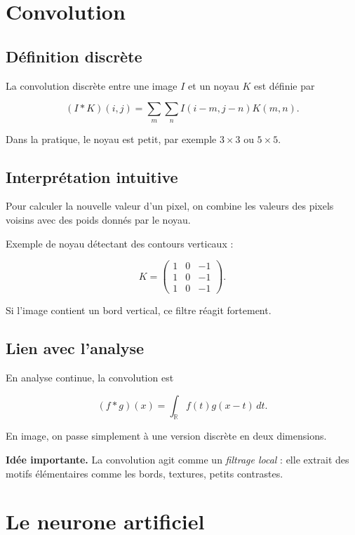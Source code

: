 ﻿\documentclass[11pt,a4paper]{article}
\begin{document}
\section{Convolution}

\subsection{Définition discrète}

La convolution discrète entre une image $I$ et un noyau $K$ est définie par

\[
(I * K)(i,j)=\sum_m \sum_n I(i-m,j-n)K(m,n).
\]

Dans la pratique, le noyau est petit, par exemple $3\times 3$ ou $5\times 5$.

\subsection{Interprétation intuitive}

Pour calculer la nouvelle valeur d’un pixel, on combine les valeurs des pixels voisins avec des poids donnés par le noyau.

Exemple de noyau détectant des contours verticaux :

\[
K=
\begin{pmatrix}
1 & 0 & -1 \\
1 & 0 & -1 \\
1 & 0 & -1
\end{pmatrix}.
\]

Si l’image contient un bord vertical, ce filtre réagit fortement.

\subsection{Lien avec l’analyse}

En analyse continue, la convolution est

\[
(f*g)(x)=\int_{\mathbb{R}} f(t)g(x-t)\,dt.
\]

En image, on passe simplement à une version discrète en deux dimensions.

\textbf{Idée importante.}  
La convolution agit comme un \emph{filtrage local} : elle extrait des motifs élémentaires comme
les bords, textures, petits contrastes.

\section{Le neurone artificiel}
\end{document}
